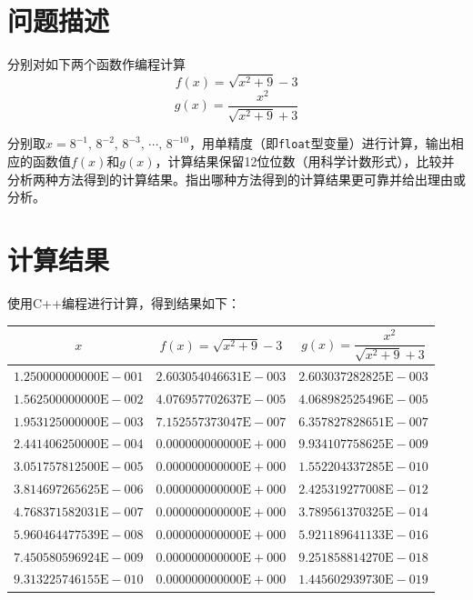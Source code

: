 \documentclass[11pt]{article}
\begin{document}
\maketitle %

\thispagestyle{empty} %

\newpage

\section{问题描述}
分别对如下两个函数作编程计算
$$
    f(x) = \sqrt{x^2 + 9} - 3
$$
$$
    g(x) = \frac{x^2}{\sqrt{x^2 + 9} + 3}
$$

分别取$x = 8^{-1},\, 8^{-2},\, 8^{-3},\, \cdots,\, 8^{-10}$，用单精度（即\texttt{float}型变量）进行计算，输出相应的函数值$f(x)$和$g(x)$，计算结果保留12位位数（用科学计数形式），比较并分析两种方法得到的计算结果。指出哪种方法得到的计算结果更可靠并给出理由或分析。

\section{计算结果}
使用C++编程进行计算，得到结果如下：
\begin{table}[h]
    \centering
    \begin{tabular}{|c|c|c|}
        \hline
        $x$                            & $f(x) = \sqrt{x^2 + 9} - 3$    & $g(x) = \dfrac{x^2}{\sqrt{x^2 + 9} + 3}$ \\ \hline
        $1.250000000000\text{E}{-}001$ & $2.603054046631\text{E}{-}003$ & $2.603037282825\text{E}{-}003$           \\ \hline
        $1.562500000000\text{E}{-}002$ & $4.076957702637\text{E}{-}005$ & $4.068982525496\text{E}{-}005$           \\ \hline
        $1.953125000000\text{E}{-}003$ & $7.152557373047\text{E}{-}007$ & $6.357827828651\text{E}{-}007$           \\ \hline
        $2.441406250000\text{E}{-}004$ & $0.000000000000\text{E}{+}000$ & $9.934107758625\text{E}{-}009$           \\ \hline
        $3.051757812500\text{E}{-}005$ & $0.000000000000\text{E}{+}000$ & $1.552204337285\text{E}{-}010$           \\ \hline
        $3.814697265625\text{E}{-}006$ & $0.000000000000\text{E}{+}000$ & $2.425319277008\text{E}{-}012$           \\ \hline
        $4.768371582031\text{E}{-}007$ & $0.000000000000\text{E}{+}000$ & $3.789561370325\text{E}{-}014$           \\ \hline
        $5.960464477539\text{E}{-}008$ & $0.000000000000\text{E}{+}000$ & $5.921189641133\text{E}{-}016$           \\ \hline
        $7.450580596924\text{E}{-}009$ & $0.000000000000\text{E}{+}000$ & $9.251858814270\text{E}{-}018$           \\ \hline
        $9.313225746155\text{E}{-}010$ & $0.000000000000\text{E}{+}000$ & $1.445602939730\text{E}{-}019$           \\ \hline
    \end{tabular}
\end{table}
\end{document}

